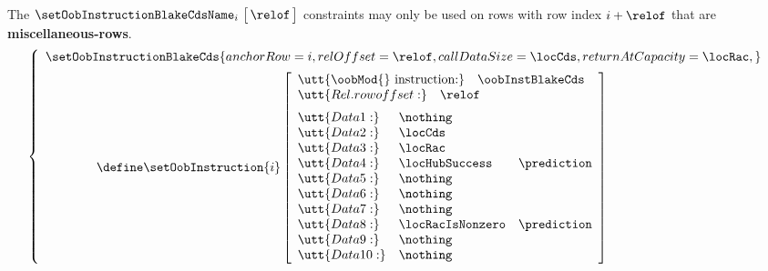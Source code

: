 \saNote{} The $\setOobInstructionBlakeCdsName _{i} \big[ \, \relof \, \big]$ constraints may only be used on rows with row index $i + \relof$ that are \textbf{miscellaneous-rows}.
\[
        \left\{ \begin{array}{l}
                \setOobInstructionBlakeCds {
                        anchorRow        = i       ,
                        relOffset        = \relof  ,
                        callDataSize     = \locCds ,
                        returnAtCapacity = \locRac ,
                        }
                \vspace{2mm} \\
                \qquad \qquad \define
                \setOobInstruction{i}
                \left[ \begin{array}{llr}
                        \multicolumn{3}{l}{$\utt{\oobMod{} instruction:} ~ \oobInstBlakeCds$} \\
                        \multicolumn{3}{l}{\utt{Rel. row offset:} \quad \relof} \vspace{2mm}  \\
			\utt{Data 1:}  & \nothing         \\
                        \utt{Data 2:}  & \locCds          \\
                        \utt{Data 3:}  & \locRac          \\
                        \utt{Data 4:}  & \locHubSuccess    & \prediction \\
                        \utt{Data 5:}  & \nothing         \\
                        \utt{Data 6:}  & \nothing         \\
                        \utt{Data 7:}  & \nothing         \\
                        \utt{Data 8:}  & \locRacIsNonzero  & \prediction \\
                        \utt{Data 9:}  & \nothing         \\
                        \utt{Data 10:} & \nothing         \\
                \end{array} \right]
                \\
        \end{array} \right.
\]

